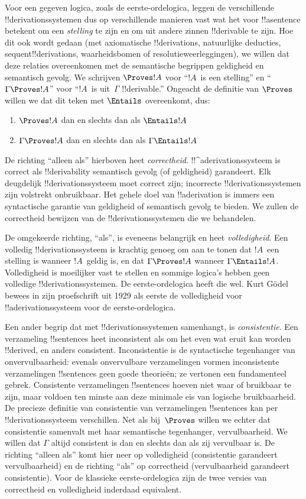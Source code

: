 \documentclass[../../../include/open-logic-section]{subfiles}
\begin{document}
Voor een gegeven logica, zoals de eerste-ordelogica, leggen de
verschillende !!{derivation}ssystemen dus op verschillende manieren vast
wat het voor !!a{sentence} betekent om een \emph{stelling} te zijn
en om uit andere zinnen !!{derivable} te zijn. Hoe dit ook wordt gedaan
(met axiomatische !!{derivation}s, natuurlijke deducties,
sequent!!{derivation}s, waarheidsbomen of resolutieweerleggingen), we
willen dat deze relaties overeenkomen met de semantische begrippen
geldigheid en semantisch gevolg. We schrijven $\Proves !A$ voor
``$!A$~is een stelling'' en ``$\Gamma \Proves !A$'' voor
``$!A$~is uit~$\Gamma$ !!{derivable}.'' Ongeacht de definitie van
$\Proves$ willen we dat dit teken met $\Entails$ overeenkomt, dus:
\begin{enumerate}
\item $\Proves !A$ dan en slechts dan als $\Entails !A$
\item $\Gamma \Proves !A$ dan en slechts dan als $\Gamma \Entails !A$
\end{enumerate}
De richting ``alleen als'' hierboven heet \emph{correctheid}.
!!^a{derivation}ssysteem is correct als !!{derivability} semantisch
gevolg (of geldigheid) garandeert. Elk deugdelijk
!!{derivation}ssysteem moet correct zijn; incorrecte
!!{derivation}ssystemen zijn volstrekt onbruikbaar. Het gehele doel van
!!a{derivation} is immers een syntactische garantie van geldigheid of
semantisch gevolg te bieden. We zullen de correctheid bewijzen van de
!!{derivation}ssystemen die we behandelen.

De omgekeerde richting, ``als'', is eveneens belangrijk en heet
\emph{volledigheid}. Een volledig !!{derivation}ssysteem is krachtig
genoeg om aan te tonen dat $!A$~een stelling is wanneer $!A$~geldig is,
en dat $\Gamma \Proves !A$ wanneer $\Gamma \Entails !A$.
Volledigheid is moeilijker vast te stellen en sommige logica's hebben
geen volledige !!{derivation}ssystemen. De eerste-ordelogica heeft die
wel. Kurt G\"odel bewees in zijn proefschrift uit 1929 als eerste de
volledigheid voor !!a{derivation}ssysteem voor de eerste-ordelogica.

Een ander begrip dat met !!{derivation}ssystemen samenhangt, is
\emph{consistentie}. Een verzameling !!{sentence}s heet inconsistent
als om het even wat eruit kan worden !!{derive}d, en anders consistent.
Inconsistentie is de syntactische tegenhanger van onvervulbaarheid:
evenals onvervulbare verzamelingen vormen inconsistente verzamelingen
!!{sentence}s geen goede theorieën; ze vertonen een fundamenteel
gebrek. Consistente verzamelingen !!{sentence}s hoeven niet waar of
bruikbaar te zijn, maar voldoen ten minste aan deze minimale eis van
logische bruikbaarheid. De precieze definitie van consistentie van
verzamelingen !!{sentence}s kan per !!{derivation}ssysteem verschillen.
Net als bij~$\Proves$ willen we echter dat consistentie samenvalt met
haar semantische tegenhanger, vervulbaarheid. We willen dat $\Gamma$
altijd consistent is dan en slechts dan als zij vervulbaar is. De
richting ``alleen als'' komt hier neer op volledigheid (consistentie
garandeert vervulbaarheid) en de richting ``als'' op correctheid
(vervulbaarheid garandeert consistentie). Voor de klassieke
eerste-ordelogica zijn de twee versies van correctheid en volledigheid
inderdaad equivalent.
\end{document}
